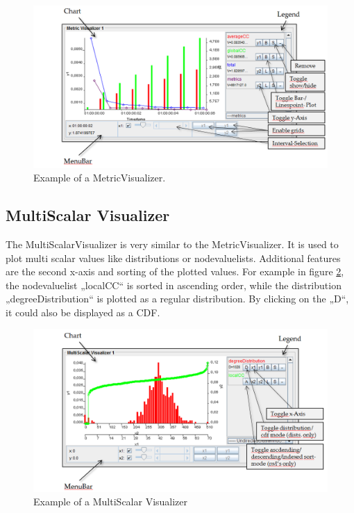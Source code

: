 \begin{figure} [h]
\centering
\includegraphics [scale=0.5] {images/metricvis1}
\caption{Example of a MetricVisualizer.}
\label{fig:metricvis1}
\end{figure}

\subsection{MultiScalar Visualizer}
The MultiScalarVisualizer is very similar to the MetricVisualizer. It is used to plot multi scalar values like distributions or nodevaluelists. Additional features are the second x-axis and sorting of the plotted values. For example in figure \ref{fig:multi1}, the nodevaluelist „localCC“ is sorted in ascending order, while the distribution „degreeDistribution“ is plotted as a regular distribution. By clicking on the „D“, it could also be displayed as a CDF.

\begin{figure} [h]
\centering
\includegraphics [scale=0.5] {images/multi1}
\caption{Example of a MultiScalar Visualizer}
\label{fig:multi1}
\end{figure}

